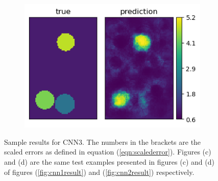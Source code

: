 \documentclass[12pt]{article}
\newcommand{\nhghalfwidth}{0.48\linewidth}
\newcommand{\nhgtotalheight}{4cm}
\begin{document}
\begin{figure}[!h]
\begin{subfigure}[c]{\nhghalfwidth}
  \end{subfigure}
  \begin{subfigure}[c]{\nhghalfwidth}
    \centering
    \includegraphics[totalheight=\nhgtotalheight]{Figures/Results3/ex4/mu.png}
  \end{subfigure}
\caption{\label{fig:cnn3result} Sample results for CNN3. The numbers in the brackets are the scaled errors as defined in equation (\ref{eqn:scalederror}). Figures (c) and (d) are the same test examples presented in figures (c) and (d) of figures (\ref{fig:cnn1result}) and (\ref{fig:cnn2result}) respectively.}  
\end{figure}
%
\end{document}
